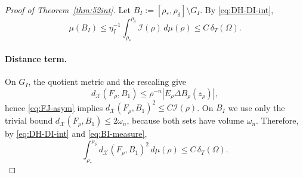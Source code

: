 \documentclass[11pt]{article}
\theoremstyle{definition}
\newcommand{\Om}{\Omega}
\newcommand{\rstar}{\rho_{*}}
\newcommand{\X}{\mathcal X}
\begin{document}
\begin{proof}[Proof of Theorem~\ref{thm:52int}]
Let $B_I:=[\rstar,\rho_\delta]\setminus G_I$.  By \eqref{eq:DH-DI-int},
\begin{equation}\label{eq:BI-measure}
   \mu(B_I)\le \eta_I^{-1}\int_{\rstar}^{\rho_\delta}\mathcal I(\rho)\,d\mu(\rho)
   \le C\,\delta_T(\Om).
\end{equation}

\paragraph{Distance term.}
On $G_I$, the quotient metric and the rescaling give
\begin{equation}\label{eq:dist-trivial}
   d_\X(F_\rho,B_1)
   \le \rho^{-n}|E_\rho\Delta B_\rho(z_\rho)|,
\end{equation}
hence \eqref{eq:FJ-asym} implies
$d_\X(F_\rho,B_1)^2\le C\mathcal I(\rho)$.  On $B_I$ we use only the
trivial bound $d_\X(F_\rho,B_1)\le 2\omega_n$, because both sets have
volume $\omega_n$.  Therefore, by \eqref{eq:DH-DI-int} and
\eqref{eq:BI-measure},
\begin{equation}\label{eq:dist-action}
   \int_{\rstar}^{\rho_\delta}d_\X(F_\rho,B_1)^2\,d\mu(\rho)
   \le C\,\delta_T(\Om).
\end{equation}


\end{proof}
\end{document}
